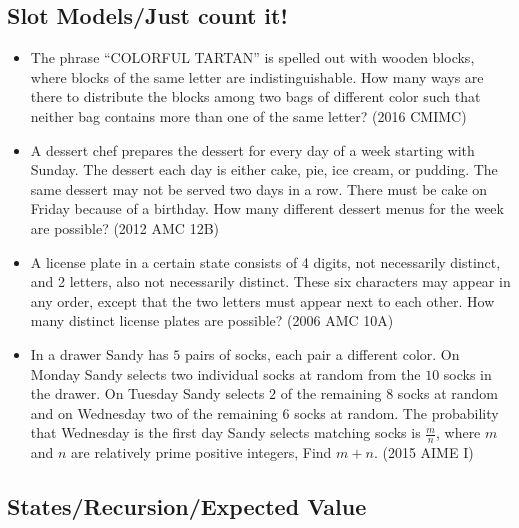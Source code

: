 \documentclass{article}
\begin{document}
\subsection{Slot Models/Just count it!}

\begin{itemize}

\item The phrase ``COLORFUL TARTAN'' is spelled out with wooden blocks, where blocks of the same letter are indistinguishable. How many ways are there to distribute the blocks among two bags of different color such that neither bag contains more than one of the same letter? (2016 CMIMC)

\item A dessert chef prepares the dessert for every day of a week starting with Sunday. The dessert each day is either cake, pie, ice cream, or pudding. The same dessert may not be served two days in a row. There must be cake on Friday because of a birthday. How many different dessert menus for the week are possible? (2012 AMC 12B)

\item A license plate in a certain state consists of 4 digits, not necessarily distinct, and 2 letters, also not necessarily distinct. These six characters may appear in any order, except that the two letters must appear next to each other. How many distinct license plates are possible? (2006 AMC 10A)

\item In a drawer Sandy has $5$ pairs of socks, each pair a different color.  On Monday Sandy selects two individual socks at random from the $10$ socks in the drawer.  On Tuesday Sandy selects $2$ of the remaining $8$ socks at random and on Wednesday two of the remaining $6$ socks at random.  The probability that Wednesday is the first day Sandy selects matching socks is $\frac{m}{n}$, where $m$ and $n$ are relatively prime positive integers,  Find $m+n$. (2015 AIME I)

\end{itemize}


\subsection{States/Recursion/Expected Value}
\end{document}
